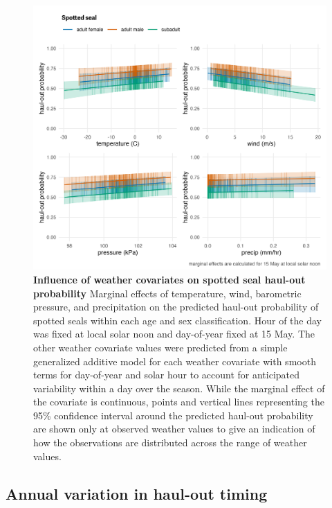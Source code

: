 \documentclass[fleqn,10pt,lineno]{wlpeerj} %
\begin{document}
\begin{figure}
\includegraphics[width=1\linewidth]{../figures/Figure-010} \caption{\textbf{Influence of weather covariates on spotted seal haul-out probability} \linebreak Marginal effects of temperature, wind, barometric pressure, and precipitation on the predicted haul-out probability of spotted seals within each age and sex classification. Hour of the day was fixed at local solar noon and day-of-year fixed at 15 May. The other weather covariate values were predicted from a simple generalized additive model for each weather covariate with smooth terms for day-of-year and solar hour to account for anticipated variability within a day over the season. While the marginal effect of the covariate is continuous, points and vertical lines representing the 95\% confidence interval around the predicted haul-out probability are shown only at observed weather values to give an indication of how the observations are distributed across the range of weather values.}\label{fig:spottedHOwx}
\end{figure}

\subsection*{Annual variation in haul-out timing}\label{annual-variation-in-haul-out-timing}
\end{document}
